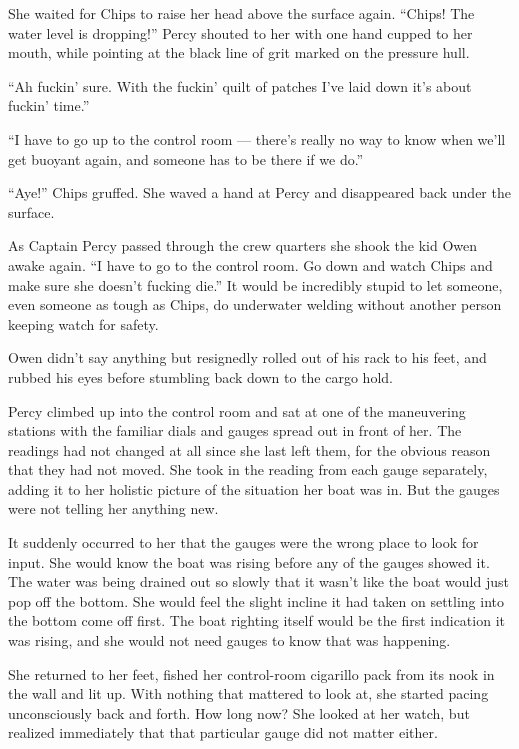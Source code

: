 \documentclass[
]{scrbook}
\begin{document}
She waited for Chips to raise her head above the surface again. ``Chips!
The water level is dropping!'' Percy shouted to her with one hand cupped
to her mouth, while pointing at the black line of grit marked on the
pressure hull.

``Ah fuckin' sure. With the fuckin' quilt of patches I've laid down it's
about fuckin' time.''

``I have to go up to the control room --- there's really no way to know
when we'll get buoyant again, and someone has to be there if we do.''

``Aye!'' Chips gruffed. She waved a hand at Percy and disappeared back
under the surface.

As Captain Percy passed through the crew quarters she shook the kid Owen
awake again. ``I have to go to the control room. Go down and watch Chips
and make sure she doesn't fucking die.'' It would be incredibly stupid
to let someone, even someone as tough as Chips, do underwater welding
without another person keeping watch for safety.

Owen didn't say anything but resignedly rolled out of his rack to his
feet, and rubbed his eyes before stumbling back down to the cargo hold.

Percy climbed up into the control room and sat at one of the maneuvering
stations with the familiar dials and gauges spread out in front of her.
The readings had not changed at all since she last left them, for the
obvious reason that they had not moved. She took in the reading from
each gauge separately, adding it to her holistic picture of the
situation her boat was in. But the gauges were not telling her anything
new.

It suddenly occurred to her that the gauges were the wrong place to look
for input. She would know the boat was rising before any of the gauges
showed it. The water was being drained out so slowly that it wasn't like
the boat would just pop off the bottom. She would feel the slight
incline it had taken on settling into the bottom come off first. The
boat righting itself would be the first indication it was rising, and
she would not need gauges to know that was happening.

She returned to her feet, fished her control-room cigarillo pack from
its nook in the wall and lit up. With nothing that mattered to look at,
she started pacing unconsciously back and forth. How long now? She
looked at her watch, but realized immediately that that particular gauge
did not matter either.
\end{document}

